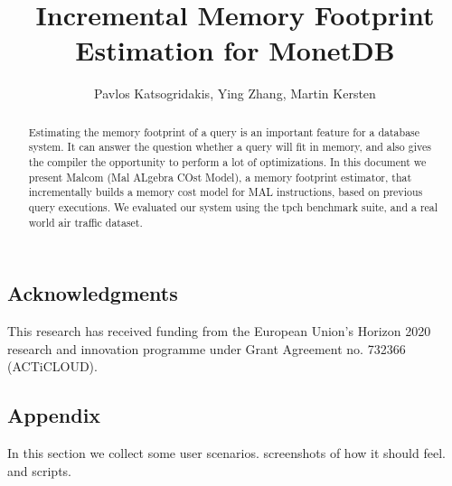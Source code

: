 \documentclass{vldb}
\begin{document}
\title{Incremental Memory Footprint Estimation for MonetDB}

\author{Pavlos Katsogridakis, Ying Zhang, Martin Kersten}

\maketitle

\begin{abstract}
Estimating the memory footprint of a query is an important
feature for a database system. It can answer the question whether
a query will fit in memory, and also gives the compiler the opportunity
to perform a lot of optimizations.
In this document we present Malcom (Mal ALgebra COst Model), a memory footprint
estimator, that incrementally builds a memory cost model for MAL instructions,
based on previous query executions. We evaluated our system using the tpch
benchmark suite, and a real world air traffic dataset.
\end{abstract}






\subsection*{Acknowledgments}
This research has received funding from the European Union’s Horizon 2020 research and innovation programme under Grant Agreement no. 732366 (ACTiCLOUD).

{\small


}
\subsection*{Appendix}
In this section we collect some user scenarios. screenshots of how it should feel.
and scripts.
\end{document}

